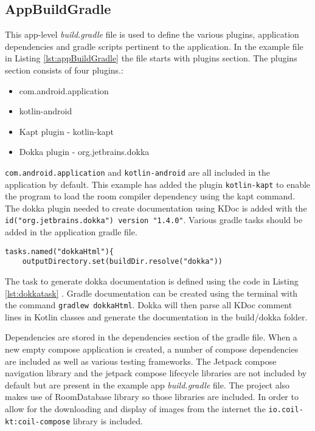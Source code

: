 \documentclass[12pt]{article}
\begin{document}
\subsection{AppBuildGradle}

This app-level  \textit{build.gradle} file is used to define the various plugins, application dependencies and gradle scripts pertinent to the application. In the example file in Listing \ref{lst:appBuildGradle} the file starts with plugins section. The plugins section consists of four plugins.:
\begin{itemize}
    \item com.android.application
    \item kotlin-android
    \item Kapt plugin - kotlin-kapt
    \item Dokka plugin - org.jetbrains.dokka
\end{itemize}
\verb|com.android.application| and \verb|kotlin-android| are all included in the application by default. This example has added the plugin \verb|kotlin-kapt| to enable the program to load the room compiler dependency using the kapt command. The dokka plugin needed to create documentation using KDoc is added with the \verb|id("org.jetbrains.dokka") version "1.4.0"|.
Various gradle tasks should be added in the application gradle file. 
\begin{lstlisting}[numbers=none, 
			caption=Task to generate Dokka documentation,
			label={lst:dokkatask}]
tasks.named("dokkaHtml"){
	outputDirectory.set(buildDir.resolve("dokka"))
\end{lstlisting}
The task to generate dokka documentation is defined using the code in Listing \ref{lst:dokkatask} . Gradle documentation can be created using the terminal with the command \verb|gradlew dokkaHtml|. Dokka will then parse all KDoc comment lines in Kotlin classes and generate the documentation in the build/dokka folder. 

Dependencies are stored in the dependencies section of the gradle file. When a new empty compose application is created, a number of compose dependencies are included as well as various testing frameworks. The Jetpack compose navigation library and the jetpack compose lifecycle libraries are not included by default but are present in the example app \textit{build.gradle} file. The project also makes use of RoomDatabase library so those libraries are included. In order to allow for the downloading and display of images from the internet the \verb|io.coil-kt:coil-compose| library is included. 
\end{document}
